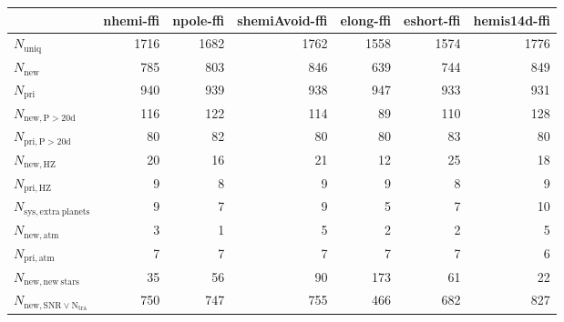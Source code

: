 \begin{tabular}{lrrrrrr}
\toprule
{} &  nhemi-ffi &  npole-ffi &  shemiAvoid-ffi &  elong-ffi &  eshort-ffi &  hemis14d-ffi \\
\midrule
$N_{\mathrm{uniq}}$                &       1716 &       1682 &            1762 &       1558 &        1574 &          1776 \\
$N_{\mathrm{new}}$                 &        785 &        803 &             846 &        639 &         744 &           849 \\
$N_{\mathrm{pri}}$                 &        940 &        939 &             938 &        947 &         933 &           931 \\
$N_{\mathrm{new,P>20d}}$           &        116 &        122 &             114 &         89 &         110 &           128 \\
$N_{\mathrm{pri,P>20d}}$           &         80 &         82 &              80 &         80 &          83 &            80 \\
$N_{\mathrm{new,HZ}}$              &         20 &         16 &              21 &         12 &          25 &            18 \\
$N_{\mathrm{pri,HZ}}$              &          9 &          8 &               9 &          9 &           8 &             9 \\
$N_{\mathrm{sys,extra\ planets}}$  &          9 &          7 &               9 &          5 &           7 &            10 \\
$N_{\mathrm{new,atm}}$             &          3 &          1 &               5 &          2 &           2 &             5 \\
$N_{\mathrm{pri,atm}}$             &          7 &          7 &               7 &          7 &           7 &             6 \\
$N_{\mathrm{new,new\ stars}}$      &         35 &         56 &              90 &        173 &          61 &            22 \\
$N_{\mathrm{new,SNR\lor N_{tra}}}$ &        750 &        747 &             755 &        466 &         682 &           827 \\
\bottomrule
\end{tabular}
